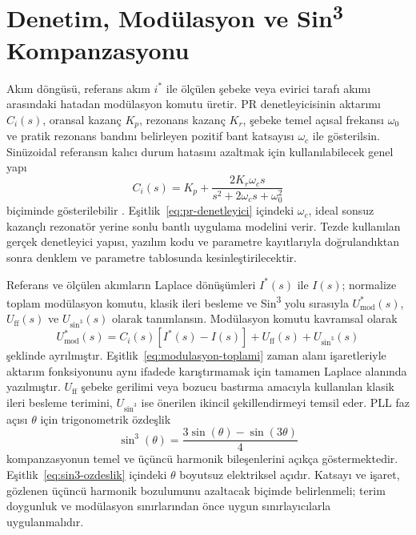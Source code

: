 \section{Denetim, Modülasyon ve Sin\texorpdfstring{\textsuperscript{3}}{3} Kompanzasyonu}

Akım döngüsü, referans akım $i^{\ast}$ ile ölçülen şebeke veya evirici tarafı akımı arasındaki hatadan modülasyon komutu üretir. PR denetleyicisinin aktarımı $C_i(s)$, oransal kazanç $K_p$, rezonans kazanç $K_r$, şebeke temel açısal frekansı $\omega_0$ ve pratik rezonans bandını belirleyen pozitif bant katsayısı $\omega_c$ ile gösterilsin. Sinüzoidal referansın kalıcı durum hatasını azaltmak için kullanılabilecek genel yapı
\begin{equation}
  C_i(s)=K_p+\frac{2K_r\omega_c s}{s^2+2\omega_c s+\omega_0^2}
  \label{eq:pr-denetleyici}
\end{equation}
biçiminde gösterilebilir \citep{Teodorescu2006PR,Zhang2014PR}. Eşitlik~\eqref{eq:pr-denetleyici} içindeki $\omega_c$, ideal sonsuz kazançlı rezonatör yerine sonlu bantlı uygulama modelini verir. Tezde kullanılan gerçek denetleyici yapısı, yazılım kodu ve parametre kayıtlarıyla doğrulandıktan sonra denklem ve parametre tablosunda kesinleştirilecektir.

Referans ve ölçülen akımların Laplace dönüşümleri $I^{\ast}(s)$ ile $I(s)$; normalize toplam modülasyon komutu, klasik ileri besleme ve Sin\textsuperscript{3} yolu sırasıyla $U_{\mathrm{mod}}^{\ast}(s)$, $U_{\mathrm{ff}}(s)$ ve $U_{\sin^3}(s)$ olarak tanımlansın. Modülasyon komutu kavramsal olarak
\begin{equation}
  U_{\mathrm{mod}}^{\ast}(s)=C_i(s)\left[I^{\ast}(s)-I(s)\right]+U_{\mathrm{ff}}(s)+U_{\sin^3}(s)
  \label{eq:modulasyon-toplami}
\end{equation}
şeklinde ayrılmıştır. Eşitlik~\eqref{eq:modulasyon-toplami} zaman alanı işaretleriyle aktarım fonksiyonunu aynı ifadede karıştırmamak için tamamen Laplace alanında yazılmıştır. $U_{\mathrm{ff}}$ şebeke gerilimi veya bozucu bastırma amacıyla kullanılan klasik ileri besleme terimini, $U_{\sin^3}$ ise önerilen ikincil şekillendirmeyi temsil eder. PLL faz açısı $\theta$ için trigonometrik özdeşlik
\begin{equation}
  \sin^3(\theta)=\frac{3\sin(\theta)-\sin(3\theta)}{4}
  \label{eq:sin3-ozdeslik}
\end{equation}
kompanzasyonun temel ve üçüncü harmonik bileşenlerini açıkça göstermektedir. Eşitlik~\eqref{eq:sin3-ozdeslik} içindeki $\theta$ boyutsuz elektriksel açıdır. Katsayı ve işaret, gözlenen üçüncü harmonik bozulumunu azaltacak biçimde belirlenmeli; terim doygunluk ve modülasyon sınırlarından önce uygun sınırlayıcılarla uygulanmalıdır.

